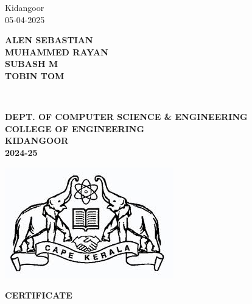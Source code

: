 \documentclass[twoside,a4paper,openright]{report} %
\begin{document}
	\noindent \begin{minipage}{0.45\linewidth}
		\begin{flushleft}
			\vspace{1 cm}
			
			Kidangoor \\
			05-04-2025\\
			
		\end{flushleft} 
	\end{minipage}
	\hfill
	\begin{minipage}{0.45\linewidth}
		\begin{flushright}                                      
			\vspace{2cm}
			
			\textbf{ALEN SEBASTIAN\\
				MUHAMMED RAYAN\\
				SUBASH M\\
				TOBIN TOM
			}
			
		\end{flushright} 
	\end{minipage}
	
	
	
	
	
\thispagestyle{empty}

\newpage
\mbox{~}
\newpage
\begin{center}
	\vspace*{2.5 cm}
	\textbf{DEPT. OF COMPUTER SCIENCE \& ENGINEERING} \\
	\textbf{COLLEGE OF ENGINEERING} \\
	\textbf{KIDANGOOR} \\
	\textbf{2024-25}
\end{center}
\begin{center}
	\includegraphics[scale=0.2]{cape.jpeg}
\end{center}
\begin{center}
	\textbf{CERTIFICATE}
\end{center}
\vspace*{1 cm}
\end{document}
